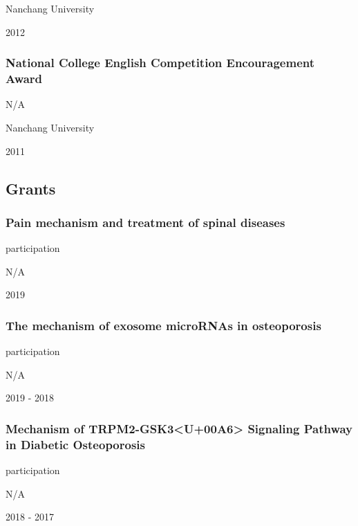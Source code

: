 \documentclass[
]{article}
\begin{document}
Nanchang University

2012

\hypertarget{national-college-english-competition-encouragement-award}{%
\subsubsection{National College English Competition Encouragement
Award}\label{national-college-english-competition-encouragement-award}}

N/A

Nanchang University

2011

\hypertarget{grants}{%
\subsection{Grants}\label{grants}}

\hypertarget{pain-mechanism-and-treatment-of-spinal-diseases}{%
\subsubsection{Pain mechanism and treatment of spinal
diseases}\label{pain-mechanism-and-treatment-of-spinal-diseases}}

participation

N/A

2019

\hypertarget{the-mechanism-of-exosome-micrornas-in-osteoporosis}{%
\subsubsection{The mechanism of exosome microRNAs in
osteoporosis}\label{the-mechanism-of-exosome-micrornas-in-osteoporosis}}

participation

N/A

2019 - 2018

\hypertarget{mechanism-of-trpm2-gsk3u00a6-signaling-pathway-in-diabetic-osteoporosis}{%
\subsubsection{Mechanism of TRPM2-GSK3\textless U+00A6\textgreater{}
Signaling Pathway in Diabetic
Osteoporosis}\label{mechanism-of-trpm2-gsk3u00a6-signaling-pathway-in-diabetic-osteoporosis}}

participation

N/A

2018 - 2017
\end{document}
